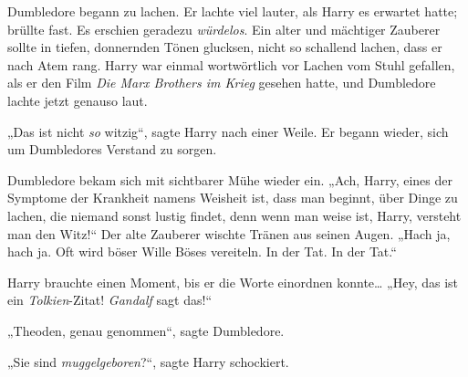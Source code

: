 Dumbledore begann zu lachen. Er lachte viel lauter, als Harry es erwartet hatte; brüllte fast. Es erschien geradezu \emph{würdelos}. Ein alter und mächtiger Zauberer sollte in tiefen, donnernden Tönen glucksen, nicht so schallend lachen, dass er nach Atem rang. Harry war einmal wortwörtlich vor Lachen vom Stuhl gefallen, als er den Film \emph{Die Marx Brothers im Krieg} gesehen hatte, und Dumbledore lachte jetzt genauso laut.

„Das ist nicht \emph{so} witzig“, sagte Harry nach einer Weile. Er begann wieder, sich um Dumbledores Verstand zu sorgen.

Dumbledore bekam sich mit sichtbarer Mühe wieder ein. „Ach, Harry, eines der Symptome der Krankheit namens Weisheit ist, dass man beginnt, über Dinge zu lachen, die niemand sonst lustig findet, denn wenn man weise ist, Harry, versteht man den Witz!“ Der alte Zauberer wischte Tränen aus seinen Augen. „Hach ja, hach ja. Oft wird böser Wille Böses vereiteln. In der Tat. In der Tat.“

Harry brauchte einen Moment, bis er die Worte einordnen konnte… „Hey, das ist ein \emph{Tolkien}-Zitat! \emph{Gandalf} sagt das!“

„Theoden, genau genommen“, sagte Dumbledore.

„Sie sind \emph{muggelgeboren}?“, sagte Harry schockiert.

